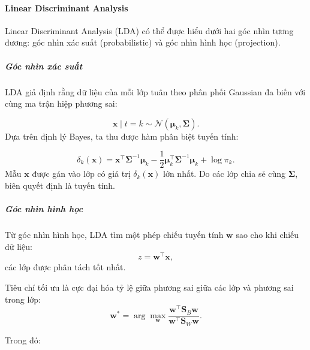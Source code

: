 \paragraph{Linear Discriminant Analysis}
Linear Discriminant Analysis (LDA) có thể được hiểu dưới hai góc nhìn tương
đương: góc nhìn xác suất (probabilistic) và góc nhìn hình học (projection).

\subparagraph{Góc nhìn xác suất}
LDA giả định rằng dữ liệu của mỗi lớp tuân theo phân phối Gaussian đa biến với
cùng ma trận hiệp phương sai:

\begin{equation}
  \boldsymbol{x} \mid t = k \sim \mathcal{N}(\boldsymbol{\mu}_k,
  \boldsymbol{\Sigma}).
\end{equation}
Dựa trên định lý Bayes, ta thu được hàm phân biệt tuyến tính:

\begin{equation}
  \delta_k(\boldsymbol{x}) = \boldsymbol{x}^\intercal \boldsymbol{\Sigma}^{-1}
  \boldsymbol{\mu}_k - \frac{1}{2} \boldsymbol{\mu}_k^\intercal
  \boldsymbol{\Sigma}^{-1} \boldsymbol{\mu}_k + \log \pi_k.
\end{equation}
Mẫu $\boldsymbol{x}$ được gán vào lớp có giá trị $\delta_k(\boldsymbol{x})$
lớn nhất. Do các lớp chia sẻ cùng $\boldsymbol{\Sigma}$, biên quyết định là
tuyến tính.

\subparagraph{Góc nhìn hình học}

Từ góc nhìn hình học, LDA tìm một phép chiếu tuyến tính
$\boldsymbol{w}$ sao cho khi chiếu dữ liệu:
\begin{equation}
  z = \boldsymbol{w}^\intercal \boldsymbol{x},
\end{equation}
các lớp được phân tách tốt nhất.

Tiêu chí tối ưu là cực đại hóa tỷ lệ giữa phương sai giữa các lớp và
phương sai trong lớp:
\begin{equation}
  \boldsymbol{w}^* = \arg\max_{\boldsymbol{w}}
  \frac{\boldsymbol{w}^\intercal \boldsymbol{S}_B \boldsymbol{w}}
       {\boldsymbol{w}^\intercal \boldsymbol{S}_W \boldsymbol{w}}.
\end{equation}

Trong đó:

